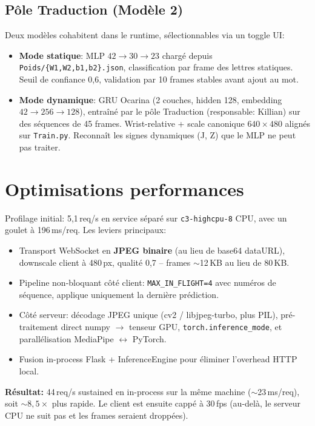 \documentclass[11pt,a4paper]{article}
\begin{document}
\subsection{Pôle Traduction (Modèle 2)}
Deux modèles cohabitent dans le runtime, sélectionnables via un toggle UI:
\begin{itemize}[leftmargin=*,itemsep=2pt]
  \item \textbf{Mode statique}: MLP $42 \rightarrow 30 \rightarrow 23$ chargé depuis
        \texttt{Poids/\{W1,W2,b1,b2\}.json}, classification par frame des lettres
        statiques. Seuil de confiance 0,6, validation par 10 frames stables avant ajout
        au mot.
  \item \textbf{Mode dynamique}: GRU Ocarina (2 couches, hidden 128, embedding
        $42\rightarrow 256 \rightarrow 128$), entraîné par le pôle Traduction
        (responsable: Killian) sur des séquences de 45 frames. Wrist-relative + scale
        canonique $640\times480$ alignés sur \texttt{Train.py}. Reconnaît les signes
        dynamiques (J, Z) que le MLP ne peut pas traiter.
\end{itemize}

\section{Optimisations performances}

Profilage initial: 5,1\,req/s en service séparé sur \texttt{c3-highcpu-8} CPU,
avec un goulet à 196\,ms/req. Les leviers principaux:

\begin{itemize}[leftmargin=*,itemsep=2pt]
  \item Transport WebSocket en \textbf{JPEG binaire} (au lieu de base64 dataURL),
        downscale client à 480\,px, qualité 0,7 -- frames $\sim$12\,KB au lieu de 80\,KB.
  \item Pipeline non-bloquant côté client: \texttt{MAX\_IN\_FLIGHT=4} avec numéros de
        séquence, applique uniquement la dernière prédiction.
  \item Côté serveur: décodage JPEG unique (cv2 / libjpeg-turbo, plus PIL),
        pré-traitement direct numpy $\rightarrow$ tenseur GPU, \texttt{torch.inference\_mode},
        et parallélisation MediaPipe $\leftrightarrow$ PyTorch.
  \item Fusion in-process Flask + InferenceEngine pour éliminer l'overhead HTTP local.
\end{itemize}

\noindent\textbf{Résultat:} 44\,req/s sustained en in-process sur la même machine
($\sim$23\,ms/req), soit $\sim8,\!5\times$ plus rapide. Le client est ensuite cappé à
30\,fps (au-delà, le serveur CPU ne suit pas et les frames seraient droppées).
\end{document}
